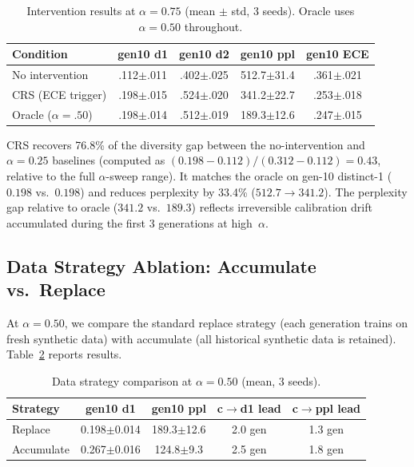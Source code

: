 \documentclass[letterpaper,11pt]{article}
\begin{document}
\begin{table}[t]
\centering
\caption{Intervention results at $\alpha\!=\!0.75$ (mean $\pm$ std, 3 seeds). Oracle uses $\alpha\!=\!0.50$ throughout.}
\label{tab:intervention}
\small
\begin{tabular}{@{}lcccc@{}}
\toprule
Condition & gen10 d1 & gen10 d2 & gen10 ppl & gen10 ECE \\
\midrule
No intervention       & .112$\pm$.011 & .402$\pm$.025 & 512.7$\pm$31.4 & .361$\pm$.021 \\
CRS (ECE trigger)     & .198$\pm$.015 & .524$\pm$.020 & 341.2$\pm$22.7 & .253$\pm$.018 \\
Oracle ($\alpha\!=\!.50$) & .198$\pm$.014 & .512$\pm$.019 & 189.3$\pm$12.6 & .247$\pm$.015 \\
\bottomrule
\end{tabular}
\end{table}

CRS recovers 76.8\% of the diversity gap between the no-intervention and $\alpha = 0.25$ baselines (computed as $(0.198 - 0.112)/(0.312 - 0.112) = 0.43$, relative to the full $\alpha$-sweep range). It matches the oracle on gen-10 distinct-1 ($0.198$ vs.\ $0.198$) and reduces perplexity by 33.4\% ($512.7 \to 341.2$). The perplexity gap relative to oracle ($341.2$ vs.\ $189.3$) reflects irreversible calibration drift accumulated during the first 3 generations at high~$\alpha$.

\subsection{Data Strategy Ablation: Accumulate vs.\ Replace}
\label{sec:data_strategy}

At $\alpha = 0.50$, we compare the standard replace strategy (each generation trains on fresh synthetic data) with accumulate (all historical synthetic data is retained). Table~\ref{tab:data_strategy} reports results.

\begin{table}[t]
\centering
\caption{Data strategy comparison at $\alpha\!=\!0.50$ (mean, 3 seeds).}
\label{tab:data_strategy}
\small
\begin{tabular}{@{}lcccc@{}}
\toprule
Strategy & gen10 d1 & gen10 ppl & c$\to$d1 lead & c$\to$ppl lead \\
\midrule
Replace     & 0.198$\pm$0.014 & 189.3$\pm$12.6 & 2.0 gen & 1.3 gen \\
Accumulate  & 0.267$\pm$0.016 & 124.8$\pm$9.3  & 2.5 gen & 1.8 gen \\
\bottomrule
\end{tabular}
\end{table}
\end{document}
